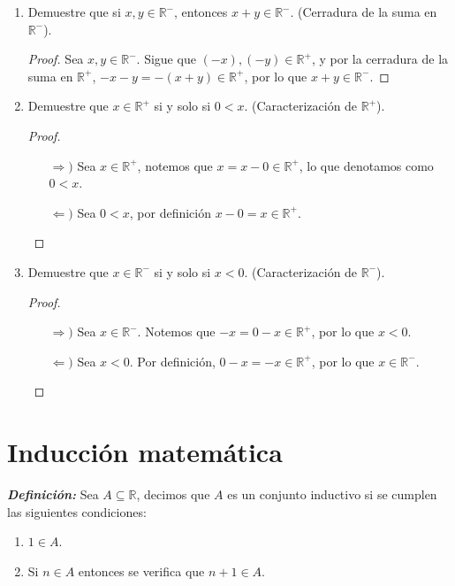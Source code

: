 \documentclass[11pt]{article}
\newcommand{\R}{\mathbb{R}}
\newcommand{\bfit}[1]{\textbf{\textit{#1}}}
\let\subset\subseteq
\begin{document}
\begin{enumerate}[label=\alph*)]
    \item Demuestre que si $x,y \in \R^-$, entonces $x+y\in \R^-$. (Cerradura de la suma en $\R^-$).
    \vspace{-1em}
    \begin{proof}
    Sea $x,y\in \R^-$. Sigue que $(-x), (-y)\in \R^+$, y por la cerradura de la suma en $\R^+$, $-x-y=-(x+y)\in \R^+$, por lo que $x+y\in \R^-$.
    \end{proof} \vspace{-1em}

    \item Demuestre que $x\in \R^+$ si y solo si $0<x$. (Caracterización de $\R^+$).
    \vspace{-1em}
    \begin{proof}\leavevmode
    \begin{itemize}
    \item[$\Rightarrow)$] Sea $x\in \R^+$, notemos que $x=x-0\in \R^+$, lo que denotamos como $0<x$.
    \item[$\Leftarrow)$] Sea $0<x$, por definición $x-0=x\in \R^+$. \qedhere
    \end{itemize}
    \end{proof} \vspace{-1em}

    \item Demuestre que $x\in \R^-$ si y solo si $x<0$. (Caracterización de $\R^-$).
    \vspace{-1em}
    \begin{proof}\leavevmode
    \begin{itemize}
    \item[$\Rightarrow)$] Sea $x\in \R^-$. Notemos que $-x=0-x\in \R^+$, por lo que $x<0$.
    \item[$\Leftarrow)$] Sea $x<0$. Por definición, $0-x=-x\in \R^+$, por lo que $x\in \R^-$. \qedhere
    \end{itemize}
    \end{proof} \vspace{-1em}
\end{enumerate}

\pagebreak

\part*{Inducción matemática}

\bfit{Definición:}  Sea $A\subset \R$, decimos que $A$ es un conjunto inductivo si se cumplen las siguientes condiciones:
    \begin{enumerate}[label=\roman*)]
        \item $1 \in A$.
        \item Si $n \in A$ entonces se verifica que $n+1 \in A$.
    \end{enumerate}
\end{document}
